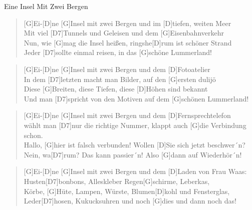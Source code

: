 \begin{song}{Eine Insel Mit Zwei Bergen}{}

    \begin{verse}  
        [G]Ei-[D]ne [G]Insel mit zwei Bergen und im [D]tiefen, weiten Meer \\
        Mit viel [D7]Tunnels und Geleisen und dem [G]Eisenbahnverkehr \\
        Nun, wie [G]mag die Insel heißen, ringshe[D]rum ist schöner Strand \\
        Jeder [D7]sollte einmal reisen, in das [G]schöne Lummerland!
    \end{verse}  

    \begin{verse}  
        [G]Ei-[D]ne [G]Insel mit zwei Bergen und dem [D]Fotoatelier \\
        In dem [D7]letzten macht man Bilder, auf den [G]ersten dulijö \\
        Diese [G]Breiten, diese Tiefen, diese [D]Höhen sind bekannt \\
        Und man [D7]spricht von den Motiven auf dem [G]schönen Lummerland!
    \end{verse}  

    \begin{verse}  
        [G]Ei-[D]ne [G]Insel mit zwei Bergen und dem [D]Fernsprechtelefon  \\
        wählt man [D7]nur die richtige Nummer, klappt auch [G]die Verbindung schon. \\
        Hallo, [G]hier ist falsch verbunden! Wollen [D]Sie sich jetzt beschwer´n? \\
        Nein, wa[D7]rum? Das kann passier´n! Also [G]dann auf Wiederhör´n!
    \end{verse}  

    \begin{verse}  
        [G]Ei-[D]ne [G]Insel mit zwei Bergen und dem [D]Laden von Frau Waas: \\
        Husten[D7]bonbons, Alleskleber Regen[G]schirme, Leberkas, \\
        Körbe, [G]Hüte, Lampen, Würste, Blumen[D]kohl und Fensterglas, \\
        Leder[D7]hosen, Kukucksuhren und noch [G]dies und dann noch das! 
    \end{verse}  

\end{song}
